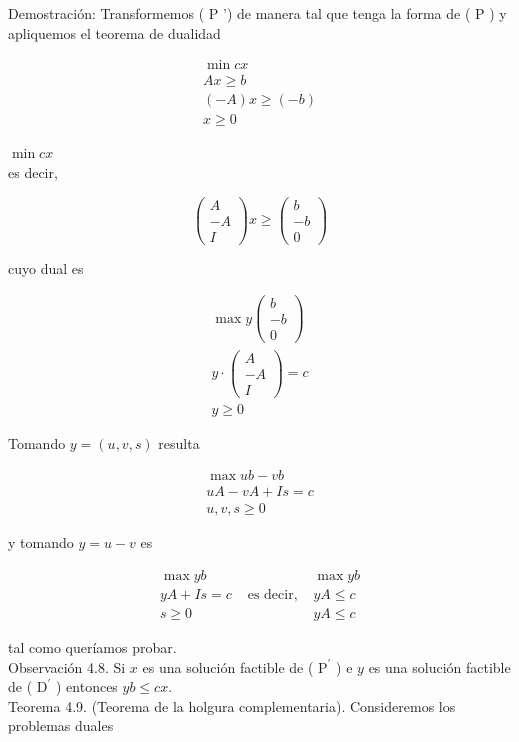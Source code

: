 \documentclass[10pt]{article}
\begin{document}
Demostración: Transformemos ( P ') de manera tal que tenga la forma de ( P ) y apliquemos el teorema de dualidad

$$
\begin{gathered}
\min c x \\
A x \geq b \\
(-A) x \geq(-b) \\
x \geq 0
\end{gathered}
$$

$\min c x$\\
es decir,

$$
\left(\begin{array}{c}
A \\
-A \\
I
\end{array}\right) x \geq\left(\begin{array}{c}
b \\
-b \\
0
\end{array}\right)
$$

cuyo dual es

$$
\begin{gathered}
\max y\left(\begin{array}{c}
b \\
-b \\
0
\end{array}\right) \\
y \cdot\left(\begin{array}{c}
A \\
-A \\
I
\end{array}\right)=c \\
y \geq 0
\end{gathered}
$$

Tomando $y=(u, v, s)$ resulta

$$
\begin{gathered}
\max u b-v b \\
u A-v A+I s=c \\
u, v, s \geq 0
\end{gathered}
$$

y tomando $y=u-v$ es

$$
\begin{array}{ccc}
\max y b & & \max y b \\
y A+I s=c & \text { es decir, } & y A \leq c \\
s \geq 0 & & y A \leq c
\end{array}
$$

tal como queríamos probar.\\
Observación 4.8. Si $x$ es una solución factible de ( $\mathrm{P}^{\prime}$ ) e $y$ es una solución factible de ( $\mathrm{D}^{\prime}$ ) entonces $y b \leq c x$.\\
Teorema 4.9. (Teorema de la holgura complementaria). Consideremos los problemas duales
\end{document}
